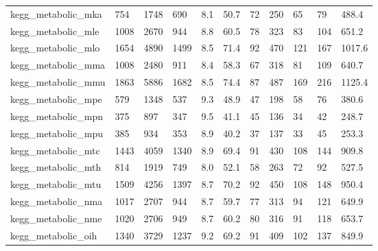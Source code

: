 \begin{longtable}{lllllllllll}
 kegg\_metabolic\_mka                                 & 754        & 1748      & 690   & 8.1    & 50.7   & 72    & 250    & 65     & 79     & 488.4   \\
 kegg\_metabolic\_mle                                 & 1008       & 2670      & 944   & 8.8    & 60.5   & 78    & 323    & 83     & 104    & 651.2   \\
 kegg\_metabolic\_mlo                                 & 1654       & 4890      & 1499  & 8.5    & 71.4   & 92    & 470    & 121    & 167    & 1017.6  \\
 kegg\_metabolic\_mma                                 & 1008       & 2480      & 911   & 8.4    & 58.3   & 67    & 318    & 81     & 109    & 640.7   \\
 kegg\_metabolic\_mmu                                 & 1863       & 5886      & 1682  & 8.5    & 74.4   & 87    & 487    & 169    & 216    & 1125.4  \\
 kegg\_metabolic\_mpe                                 & 579        & 1348      & 537   & 9.3    & 48.9   & 47    & 198    & 58     & 76     & 380.6   \\
 kegg\_metabolic\_mpn                                 & 375        & 897       & 347   & 9.5    & 41.1   & 45    & 136    & 34     & 42     & 248.7   \\
 kegg\_metabolic\_mpu                                 & 385        & 934       & 353   & 8.9    & 40.2   & 37    & 137    & 33     & 45     & 253.3   \\
 kegg\_metabolic\_mtc                                 & 1443       & 4059      & 1340  & 8.9    & 69.4   & 91    & 430    & 108    & 144    & 909.8   \\
 kegg\_metabolic\_mth                                 & 814        & 1919      & 749   & 8.0    & 52.1   & 58    & 263    & 72     & 92     & 527.5   \\
 kegg\_metabolic\_mtu                                 & 1509       & 4256      & 1397  & 8.7    & 70.2   & 92    & 450    & 108    & 148    & 950.4   \\
 kegg\_metabolic\_nma                                 & 1017       & 2707      & 944   & 8.7    & 59.7   & 77    & 313    & 94     & 121    & 649.9   \\
 kegg\_metabolic\_nme                                 & 1020       & 2706      & 949   & 8.7    & 60.2   & 80    & 316    & 91     & 118    & 653.7   \\
 kegg\_metabolic\_oih                                 & 1340       & 3729      & 1237  & 9.2    & 69.2   & 91    & 409    & 102    & 137    & 849.9   \\

\end{longtable}
